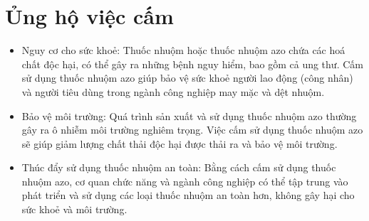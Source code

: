 \documentclass[10pt]{article}
\begin{document}
\section*{Ủng hộ việc cấm}
\begin{itemize}
  \item Nguy cơ cho sức khoẻ: Thuốc nhuộm hoặc thuốc nhuộm azo chứa các hoá chất độc hại, có thể gây ra những bệnh nguy hiểm, bao gồm cả ung thư. Cấm sử dụng thuốc nhuộm azo giúp bảo vệ sức khoẻ người lao động (công nhân) và người tiêu dùng trong ngành công nghiệp may mặc và dệt nhuộm.
  \item Bảo vệ môi trường: Quá trình sản xuất và sử dụng thuốc nhuộm azo thường gây ra ô nhiễm môi trường nghiêm trọng. Việc cấm sử dụng thuốc nhuộm azo sẽ giúp giảm lượng chất thải độc hại được thải ra và bảo vệ môi trường.
  \item Thúc đẩy sử dụng thuốc nhuộm an toàn: Bằng cách cấm sử dụng thuốc nhuộm azo, cơ quan chức năng và ngành công nghiệp có thể tập trung vào phát triển và sử dụng các loại thuốc nhuộm an toàn hơn, không gây hại cho sức khoẻ và môi trường.
\end{itemize}
\end{document}
